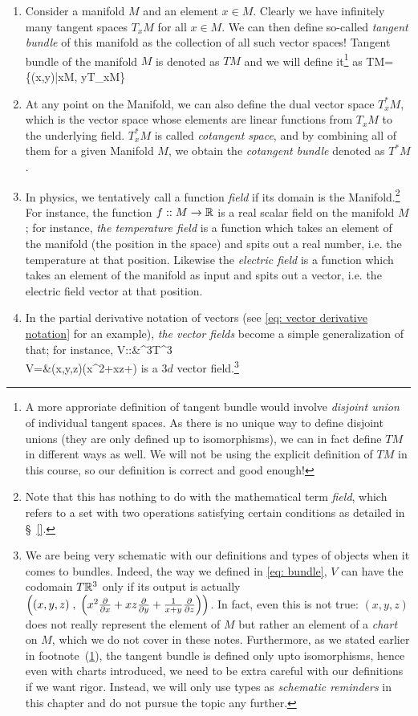 {\begin{enumerate}
	\item Consider a manifold $M$ and an element $x\in M$. Clearly we have infinitely many tangent spaces $T_xM$ for all $x\in M$. We can then define so-called \emph{tangent bundle} of this manifold as the collection of all such vector spaces! Tangent bundle of the manifold $M$ is denoted as $TM$ and we will define it\footnote{\label{footnote: tangent bundle}A more approriate definition of tangent bundle would involve \emph{disjoint union} of individual tangent spaces. As there is no unique way to define disjoint unions (they are only defined up to isomorphisms), we can in fact define $TM$ in different ways as well. We will not be using the explicit definition of $TM$ in this course, so our definition is correct and good enough!} as 
	\be 
	\label{eq: bundle}
	TM=\left\{(x,y)\;|\;x\in M,\; y\in T_xM\right\}
	\ee 
	\item At any point on the Manifold, we can also define the dual vector space $T_x^*M$, which is the vector space whose elements are linear functions from $T_xM$ to the underlying field. $T_x^*M$ is called \emph{cotangent space}, and by combining all of them for a given Manifold $M$, we obtain the \emph{cotangent bundle} denoted as $T^*M$.
	\item In physics, we tentatively call a function \emph{field} if its domain is the Manifold.\footnote{Note that this has nothing to do with the mathematical term \emph{field}, which refers to a set with two operations satisfying certain conditions as detailed in \S~\ref{}.} For instance, the function $f::M\to \mathbb{R}$ is a real scalar field on the manifold $M$; for instance, \emph{the temperature field} is a function which takes an element of the manifold (the position in the space) and spits out a real number, i.e. the temperature at that position. Likewise the \emph{electric field} is a function which takes an element of the manifold as input and spits out a vector, i.e. the electric field vector at that position.
	
	\item In the partial derivative notation of vectors (see 	\eqref{eq: vector derivative notation} for an example), \emph{the vector fields} become a simple generalization of that; for instance,
	\be 
	V::{}&{}\R^3\to T\R^3\\
	V={}&{}(x,y,z)\to\Big(x^2+xz+\Big)
	\ee 
	is a $3d$ vector field.\footnote{We are being very schematic with our definitions and types of objects when it comes to bundles. Indeed, the way we defined in \eqref{eq: bundle}, $V$ can have the codomain $T\mathbb{R}^3$ only if its output is actually $\left((x,y,z)\;,\;\Big(x^2\frac{\partial }{\partial x}+xz\frac{\partial }{\partial y}+\frac{1}{x+y}\frac{\partial }{\partial z}\Big)\right)$. In fact, even this is not true: $(x,y,z)$ does not really represent the element of $M$ but rather an element of a \emph{chart} on $M$, which we do not cover in these notes. Furthermore, as we stated earlier in footnote~(\ref{footnote: tangent bundle}), the tangent bundle is defined only upto isomorphisms, hence even with charts introduced, we need to be extra careful with our definitions if we want rigor. Instead, we will only use types as \emph{schematic reminders} in this chapter and do not pursue the topic any further.
	}
	

\end{enumerate}}
